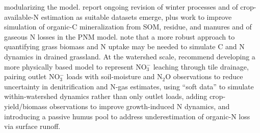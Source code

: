 modularizing the model. \textcite{Marjerison2016} report ongoing revision of winter processes and of crop-available-N estimation as suitable datasets emerge, plus work to improve simulation of organic-C mineralization from SOM, residue, and manures and of gaseous N losses in the PNM model. \textcite{Bechtold2007} note that a more robust approach to quantifying grass biomass and N uptake may be needed to simulate C and N dynamics in drained grassland. At the watershed scale, \textcite{Qi2025} recommend developing a more physically based model to represent NO$_3^-$ leaching through tile drainage, pairing outlet NO$_3^-$ loads with soil-moisture and N$_2$O observations to reduce uncertainty in denitrification and N-gas estimates, using ``soft data'' to simulate within-watershed dynamics rather than only outlet loads, adding crop-yield/biomass observations to improve growth-induced N dynamics, and introducing a passive humus pool to address underestimation of organic-N loss via surface runoff.

